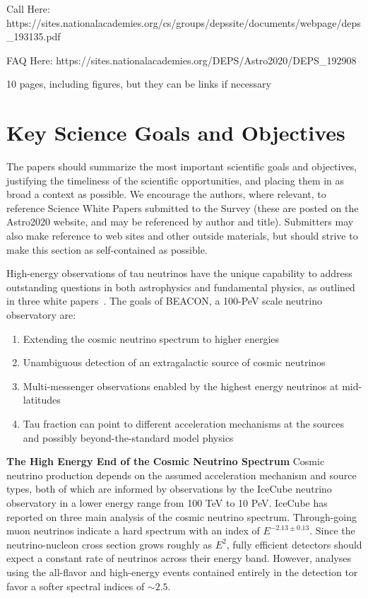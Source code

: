 \documentclass[12pt]{article}
\begin{document}
Call Here:
https://sites.nationalacademies.org/cs/groups/depssite/documents/webpage/deps\_193135.pdf

FAQ Here: 
https://sites.nationalacademies.org/DEPS/Astro2020/DEPS\_192908

10 pages, including figures, but they can be links if necessary

\section{Key Science Goals and Objectives}
\color{blue}
The papers should summarize the most important scientific goals and objectives, justifying the timeliness of the scientific opportunities, and placing them in as broad a context as possible. We encourage the authors, where relevant, to reference Science White Papers submitted to the Survey (these are posted on the Astro2020 website, and may be referenced by author and title). Submitters may also make reference to web sites and other outside materials, but should strive to make this section as self-contained as possible.
\color{black}

High-energy observations of tau neutrinos have the unique capability to address outstanding questions in both astrophysics and fundamental physics, as outlined in three white papers~\cite{Astro2020_fundamental, Astro2020_astrophysics, Astro2020_blazars}. The goals of BEACON, a 100-PeV scale neutrino observatory are:
\begin{enumerate}
	\item Extending the cosmic neutrino spectrum to higher energies	\item Unambiguous detection of an extragalactic source of cosmic neutrinos
 	\item Multi-messenger observations enabled by the highest energy neutrinos at mid-latitudes
	\item Tau fraction can point to different acceleration mechanisms at the sources and possibly beyond-the-standard model physics
\end{enumerate}

\textbf{The High Energy End of the Cosmic Neutrino Spectrum} Cosmic neutrino production depends on the assumed acceleration mechanism and source types, both of which are informed by observations by the IceCube neutrino observatory in a lower energy range from 100 TeV to 10 PeV. IceCube has reported on three main analysis of the cosmic neutrino spectrum. Through-going muon neutrinos indicate a hard spectrum with an index of $E^{-2.13\pm0.13}$. Since the neutrino-nucleon cross section grows roughly as $E^{2}$, fully efficient detectors should expect a constant rate of neutrinos across their energy band. However, analyses using the all-flavor and high-energy events contained entirely in the detection tor favor a softer spectral indices of $\sim2.5$. 
\end{document}
